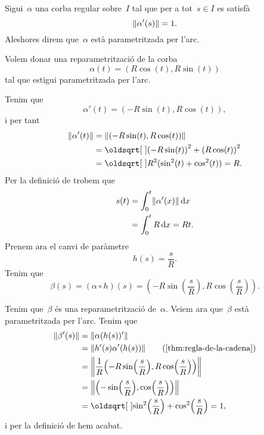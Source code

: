 \documentclass[../../main.tex]{subfiles}
\begin{document}
    \begin{definition}
        \label{def:corba-parametritzada-per-larc}
        Sigui~\(\alpha\) una corba regular sobre~\(I\) tal que per a tot~\(s\in I\) es satisfà
        \[
            \norm{\alpha'(s)}=1.
        \]
        Aleshores direm que~\(\alpha\) està parametritzada per l'arc.
    \end{definition}
    \begin{example} %
        \label{ex:reparametritzacio-per-larc-del-cercle-de-radi-R}
        \label{ex:circumferencia-de-radi-R-parametritzat-per-larc}
        Volem donar una reparametrització de la corba
        \[
            \alpha(t)=(R\cos(t),R\sin(t))
        \]
        tal que estigui parametritzada per l'arc.
    \end{example}
    \begin{solution}
        Tenim que
        \[
            \alpha'(t)=(-R\sin(t),R\cos(t)),
        \]
        i per tant
        \begin{align*}
            \norm{\alpha'(t)}&=\norm{(-R\sin(t),R\cos(t))} \\
            &=\sqrt{{(-R\sin(t))}^{2}+{(R\cos(t))}^{2}} \\
            &=\sqrt{R^{2}(\sin^{2}(t)+\cos^{2}(t))}=R.
        \end{align*}
        Per la definició de  trobem que
        \begin{align*}
            s(t)&=\int_{0}^{t}\norm{\alpha'(x)}\diff x \\
            &=\int_{0}^{t}R\diff x=Rt.
        \end{align*}
        Prenem ara el canvi de paràmetre
        \[
            h(s)=\frac{s}{R}.
        \]
        Tenim que
        \[
            \beta(s)=(\alpha\circ h)(s)=\left(-R\sin\left(\frac{s}{R}\right),R\cos\left(\frac{s}{R}\right)\right).
        \]

        Tenim que~\(\beta\) és una reparametrització de~\(\alpha\).
        Veiem ara que~\(\beta\) està parametritzada per l'arc.
        Tenim que
        \begin{align*}
            \norm{\beta'(s)}&=\norm{\alpha(h(s))'} \\
            &=\norm{h'(s)\alpha'(h(s))} \tag{\ref{thm:regla-de-la-cadena}}\\
            &=\norm{\frac{1}{R}\left(-R\sin\left(\frac{s}{R}\right),R\cos\left(\frac{s}{R}\right)\right)} \\
            &=\norm{\left(-\sin\left(\frac{s}{R}\right),\cos\left(\frac{s}{R}\right)\right)} \\
            &=\sqrt{\sin^{2}\left(\frac{s}{R}\right)+\cos^{2}\left(\frac{s}{R}\right)}=1,
        \end{align*}
        i per la definició de  hem acabat.
    \end{solution}
\end{document}
